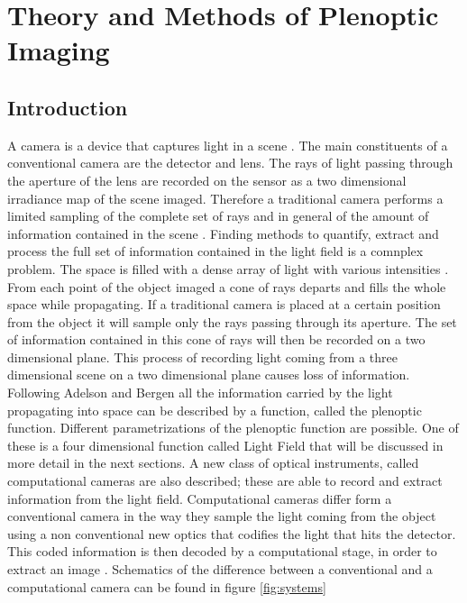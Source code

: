 \chapter{Theory and Methods of Plenoptic Imaging}
\label{chap:chapter1}
\section{Introduction}
\label{sec:intro1}
A camera is a device that captures light in a scene \cite{zhou2011computational}. The main constituents of a conventional camera are the detector and lens. The rays of light passing through the aperture of the lens are recorded on the sensor as a two dimensional irradiance map of the scene imaged. Therefore a traditional camera performs a limited sampling of the complete set of rays and in general of the amount of information contained in the scene \cite{nayar2006computational}. Finding methods to quantify, extract and process the full set of information contained in the light field is a comnplex problem. The space is filled with a dense array of light with various intensities \cite{adelson1991plenoptic}. From each point of the object imaged a cone of rays departs and fills the whole space while propagating. If a traditional camera is placed at a certain position from the object it will sample only the rays passing through its aperture. The set of information contained in this cone of rays will then be recorded on a two dimensional plane. This process of recording light coming from a three dimensional scene on a two dimensional plane causes loss of information. Following Adelson and Bergen \cite{adelson1991plenoptic} all the information carried by the light propagating into space can be described by a function, called the plenoptic function. Different parametrizations of the plenoptic function are possible. One of these is a four dimensional function called Light Field that will be discussed in more detail in the next sections. A new class of optical instruments, called computational cameras are also described; these are able to record and extract information from the light field. Computational cameras differ form a conventional camera in the way they sample the light coming from the object using a non conventional new optics that codifies the light that hits the detector. This coded information is then decoded by a computational stage, in order to extract an image \cite{nayar2006computational}. Schematics of the difference between a conventional and a computational camera can be found in figure \ref{fig:systems}
